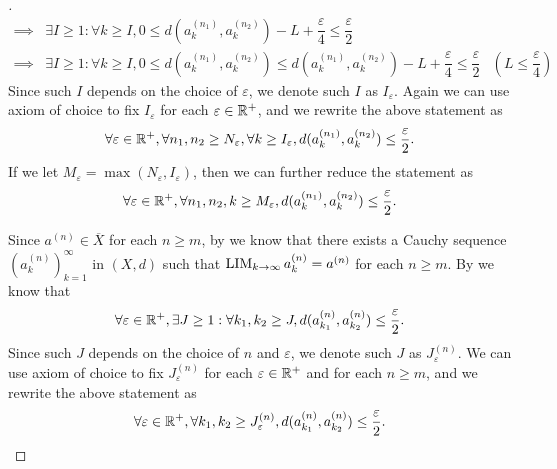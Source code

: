 \begin{proof}[]
\begin{align*}
    \implies & \exists I \geq 1 : \forall k \geq I, 0 \leq d(a_k^{(n_1)}, a_k^{(n_2)}) - L + \dfrac{\varepsilon}{4} \leq \dfrac{\varepsilon}{2}                                                                    \\
    \implies & \exists I \geq 1 : \forall k \geq I, 0 \leq d(a_k^{(n_1)}, a_k^{(n_2)}) \leq d(a_k^{(n_1)}, a_k^{(n_2)}) - L + \dfrac{\varepsilon}{4} \leq \dfrac{\varepsilon}{2} & (L \leq \dfrac{\varepsilon}{4})
  \end{align*}
  Since such \(I\) depends on the choice of \(\varepsilon\), we denote such \(I\) as \(I_\varepsilon\).
  Again we can use axiom of choice to fix \(I_\varepsilon\) for each \(\varepsilon \in \mathbb{R}^+\), and we rewrite the above statement as
  \[
    \forall \varepsilon \in \mathbb{R}^+, \forall n_1, n_2 \geq N_\varepsilon, \forall k \geq I_\varepsilon, d(a_k^{(n_1)}, a_k^{(n_2)}) \leq \dfrac{\varepsilon}{2}.
  \]
  If we let \(M_\varepsilon = \max(N_\varepsilon, I_\varepsilon)\), then we can further reduce the statement as
  \[
    \forall \varepsilon \in \mathbb{R}^+, \forall n_1, n_2, k \geq M_\varepsilon, d(a_k^{(n_1)}, a_k^{(n_2)}) \leq \dfrac{\varepsilon}{2}.
  \]

  Since \(a^{(n)} \in \overline{X}\) for each \(n \geq m\), by  we know that there exists a Cauchy sequence \((a_k^{(n)})_{k = 1}^\infty\) in \((X, d)\) such that \(\operatorname*{LIM}_{k \to \infty} a_k^{(n)} = a^{(n)}\) for each \(n \geq m\).
  By  we know that
  \[
    \forall \varepsilon \in \mathbb{R}^+, \exists J \geq 1 : \forall k_1, k_2 \geq J, d(a_{k_1}^{(n)}, a_{k_2}^{(n)}) \leq \dfrac{\varepsilon}{2}.
  \]
  Since such \(J\) depends on the choice of \(n\) and \(\varepsilon\), we denote such \(J\) as \(J_\varepsilon^{(n)}\).
  We can use axiom of choice to fix \(J_\varepsilon^{(n)}\) for each \(\varepsilon \in \mathbb{R}^+\) and for each \(n \geq m\), and we rewrite the above statement as
  \[
    \forall \varepsilon \in \mathbb{R}^+, \forall k_1, k_2 \geq J_\varepsilon^{(n)}, d(a_{k_1}^{(n)}, a_{k_2}^{(n)}) \leq \dfrac{\varepsilon}{2}.
  \]


\end{proof}
